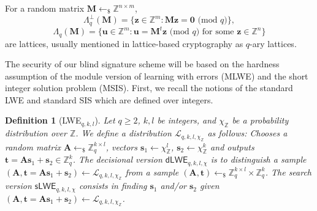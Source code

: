 \documentclass[conference]{IEEEtran}
\newtheorem{definition}{Definition}[section]
\begin{document}
	For a random matrix $\mathbf{M} \leftarrow_{\$} \mathbb{Z}^{n \times m}$,  %
	\begin{equation*}\label{eq}    \Lambda_q^{\bot}(\mathbf{M})=\{\mathbf{z} \in \mathbb{Z}^m: \mathbf{M}\mathbf{z}=\mathbf{0} \text{ (mod } q) \}, \end{equation*}
	\begin{equation*}\label{eq111}    \Lambda_q(\mathbf{M})=\{\mathbf{u} \in \mathbb{Z}^m: \mathbf{u}= \mathbf{M}^t\mathbf{z} \text{ (mod } q) \text{ for some } \mathbf{z} \in \mathbb{Z}^n \} \end{equation*}
	are lattices, usually mentioned in lattice-based cryptography as $q$-ary lattices. %
	
	
	The security of our blind signature scheme will be based on the hardness assumption of the module version of  learning with errors (\textsf{MLWE}) and the short integer solution problem (\textsf{MSIS}). 
	\iffalse
	First, we recall the notions of the standard \textsf{LWE} and standard \textsf{SIS} which are defined over integers.
	
	\begin{definition}[\textsf{LWE$_{q,k,l}$}] \label{def4}
		Let $q \geq 2$, $k, l$ be integers, and $\chi_{\mathbb{Z}} $ be a probability distribution over $\mathbb{Z}$. We define a distribution $\mathcal{L}_{q,k,l, \chi_{\mathbb{Z}} }$ as follows: Chooses a random matrix $\mathbf{A} \leftarrow_{\$} \mathbb{Z}_q^{k \times l}$, vectors $\mathbf{s}_1 \leftarrow \chi_{\mathbb{Z}} ^{l}$, $\mathbf{s}_2 \leftarrow \chi_{\mathbb{Z}} ^{k}$ and outputs $\mathbf{t}=\mathbf{A}\mathbf{s}_1+\mathbf{s}_2 \in \mathbb{Z}_q^{k}$. The decisional version $\mathsf{dLWE}_{q,k,l,\chi}$ is to distinguish a sample $(\mathbf{A}, \mathbf{t}=\mathbf{A}\mathbf{s}_1+\mathbf{s}_2) \leftarrow \mathcal{L}_{q,k,l, \chi_{\mathbb{Z} }}$ from a sample $(\mathbf{A}, \mathbf{t})  \leftarrow_{\$} \mathbb{Z}_q^{k \times l}\times  \mathbb{Z}_q^{k}$.  The search version $\mathsf{sLWE}_{q,k,l,\chi}$ consists in finding $\mathbf{s}_1$ and/or $\mathbf{s}_2$ given $(\mathbf{A}, \mathbf{t}=\mathbf{A}\mathbf{s}_1+\mathbf{s}_2) \leftarrow \mathcal{L}_{q,k,l, \chi_{\mathbb{Z}} }$. 
	\end{definition}
	
\end{document}
